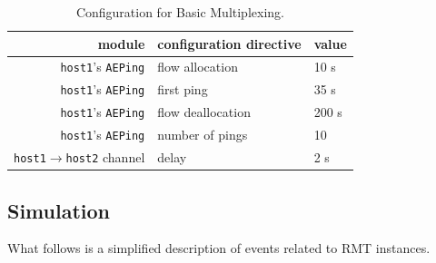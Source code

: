             \begin{table}[H]
                \begin{center}
                  \begin{tabular}{ | r | l | l | }
                    \hline
                    module & configuration directive & value \\
                    \hline
                    \texttt{host1}'s \texttt{AEPing} & flow allocation & 10 s \\
                    \texttt{host1}'s \texttt{AEPing} & first ping & 35 s \\
                    \texttt{host1}'s \texttt{AEPing} & flow deallocation & 200 s \\
                    \texttt{host1}'s \texttt{AEPing} & number of pings & 10 \\
                    \texttt{host1}$\rightarrow$\texttt{host2} channel & delay & 2 s \\
                    \hline
                  \end{tabular}
                  \caption{Configuration for Basic Multiplexing.}
                  \label{fig:examples:muxing:config}
                \end{center}
            \end{table}

        \subsection{Simulation}

            What follows is a simplified description of events related to RMT instances.

